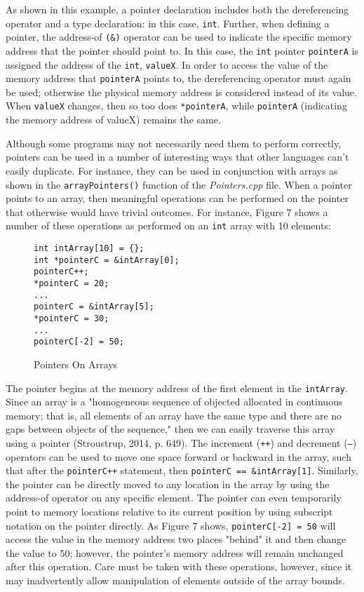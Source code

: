 \documentclass[11pt]{article}
\begin{document}
\noindent
As shown in this example, a pointer declaration includes both the dereferencing operator and a type declaration: in this case, \texttt{int}.  Further, when defining a pointer, the address-of \texttt{(\&)} operator can be used to indicate the specific memory address that the pointer should point to.  In this case, the \texttt{int} pointer \texttt{pointerA} is assigned the address of the \texttt{int}, \texttt{valueX}.  In order to access the value of the memory address that \texttt{pointerA} points to, the dereferencing operator must again be used; otherwise the physical memory address is considered instead of its value.  When \texttt{valueX} changes, then so too does \texttt{*pointerA}, while \texttt{pointerA} (indicating the memory address of valueX) remains the same.

	Although some programs may not necessarily need them to perform correctly, pointers can be used in a number of interesting ways that other languages can't easily duplicate.  For instance, they can be used in conjunction with arrays as shown in the \texttt{arrayPointers()} function of the \textit{Pointers.cpp} file.  When a pointer points to an array, then meaningful operations can be performed on the pointer that otherwise would have trivial outcomes.  For instance, Figure 7 shows a number of these operations as performed on an \texttt{int} array with 10 elements:

\begin{figure}[!h]
\centering
\begin{BVerbatim}
int intArray[10] = {};
int *pointerC = &intArray[0];
pointerC++;
*pointerC = 20;
...
pointerC = &intArray[5];
*pointerC = 30;
...
pointerC[-2] = 50;
\end{BVerbatim}
\caption{Pointers On Arrays}
\end{figure} \FloatBarrier

\noindent
The pointer begins at the memory address of the first element in the \texttt{intArray}.  Since an array is a "homogeneous sequence of objected allocated in continuous memory; that is, all elements of an array have the same type and there are no gaps between objects of the sequence," then we can easily traverse this array using a pointer (Stroustrup, 2014, p. 649).  The increment (\texttt{++}) and decrement (\texttt{--}) operators can be used to move one space forward or backward in the array, such that after the \texttt{pointerC++} statement, then \texttt{pointerC == \&intArray[1]}.  Similarly, the pointer can be directly moved to any location in the array by using the address-of operator on any specific element.  The pointer can even temporarily point to memory locations relative to its current position by using subscript notation on the pointer directly.  As Figure 7 shows, \texttt{pointerC[-2] = 50} will access the value in the memory address two places "behind" it and then change the value to 50; however, the pointer's memory address will remain unchanged after this operation.  Care must be taken with these operations, however, since it may inadvertently allow manipulation of elements outside of the array bounds.
\end{document}
